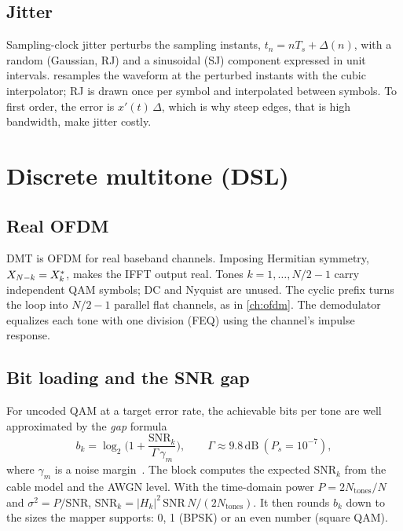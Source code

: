 \subsection{Jitter}
Sampling-clock jitter perturbs the sampling instants, $t_n=nT_s+\Delta(n)$, with a random
(Gaussian, RJ) and a sinusoidal (SJ) component expressed in unit intervals.
 resamples the waveform at the perturbed instants with the cubic interpolator; RJ is
drawn once per symbol and interpolated between symbols. To first order, the error is
$x'(t)\,\Delta$, which is why steep edges, that is high bandwidth, make jitter costly.

\section{Discrete multitone (DSL)}\label{sec:dmt}
\subsection{Real OFDM}
DMT is OFDM for real baseband channels. Imposing Hermitian symmetry, $X_{N-k}=X_k^{*}$, makes
the IFFT output real. Tones $k=1,\dots,N/2-1$ carry independent QAM symbols; DC and Nyquist are
unused. The cyclic prefix turns the loop into $N/2-1$ parallel flat channels, as in
\cref{ch:ofdm}. The demodulator equalizes each tone with one division (FEQ) using the channel's
impulse response.

\subsection{Bit loading and the SNR gap}
For uncoded QAM at a target error rate, the achievable bits per tone are well approximated by
the \emph{gap} formula
\begin{equation}
  b_k=\log_2\!\Big(1+\frac{\mathrm{SNR}_k}{\Gamma\,\gamma_m}\Big),
  \qquad\Gamma\approx9.8\,\mathrm{dB}\ (P_s=10^{-7}),
\end{equation}
where $\gamma_m$ is a noise margin~\cite{starr1999}. The block computes the expected
$\mathrm{SNR}_k$ from the cable model and the AWGN level. With the time-domain power
$P=2N_{\mathrm{tones}}/N$ and $\sigma^2=P/\mathrm{SNR}$,
$\mathrm{SNR}_k=|H_k|^2\,\mathrm{SNR}\,N/(2N_{\mathrm{tones}})$. It then rounds $b_k$ down to the
sizes the mapper supports: 0, 1 (BPSK) or an even number (square QAM).

